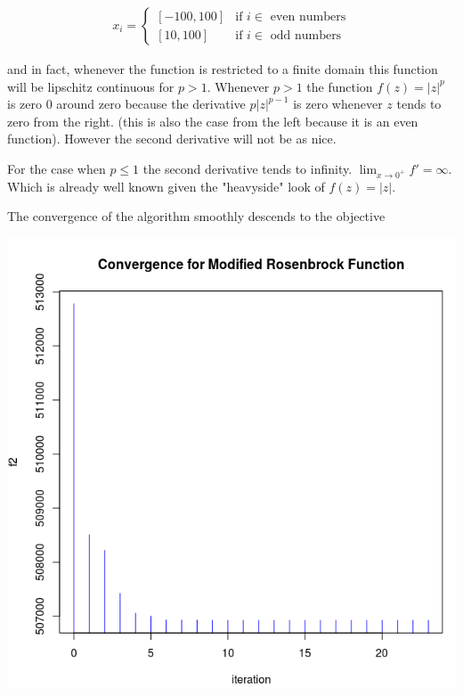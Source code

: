 \begin{equation}
  \begin{aligned}
    x_i = 
    \begin{cases}
      [-100, 100] & \text{if } i \in \text{ even numbers} \\
      [10, 100] & \text{if } i \in \text{ odd numbers}
    \end{cases}
  \end{aligned}
\end{equation}

and in fact, whenever the function is restricted to a finite domain this function will be lipschitz continuous for $p > 1$. Whenever $p > 1$ the function $f(z) = |z|^p$ is zero $0$ around zero because the derivative $p |z| ^{p-1}$ is zero whenever $z$ tends to zero from the right. (this is also the case from the left because it is an even function). However the second derivative will not be as nice.

For the case when $p \leq 1$ the second derivative tends to infinity. $\displaystyle \lim_{x \to 0^+} {f' = \infty}$. Which is already well known given the "heavyside" look of $f(z) = |z|$.

The convergence of the algorithm smoothly descends to the objective 

\begin{center}
\includegraphics[scale=0.3]{Figures/convergence.png}
\end{center}


